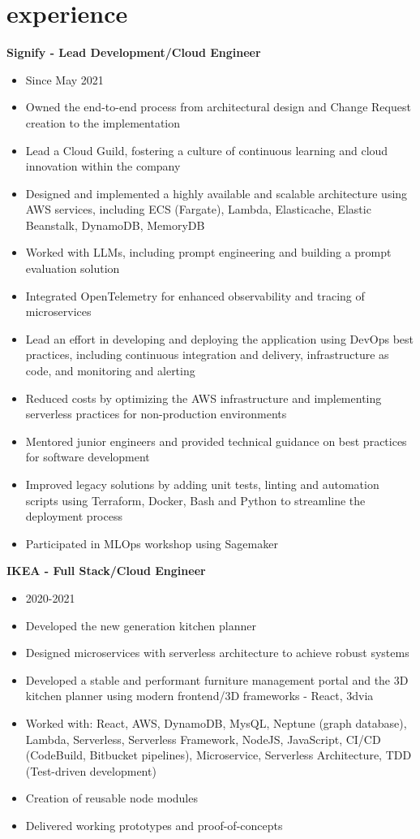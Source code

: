 \documentclass[]{friggeri-cv}
\begin{document}
\section{experience}

\textbf{Signify - Lead Development/Cloud Engineer}
\begin{itemize}
  \item Since May 2021
  \item Owned the end-to-end process from architectural design and Change Request creation to the implementation
  \item Lead a Cloud Guild, fostering a culture of continuous learning and cloud innovation within the company
  \item Designed and implemented a highly available and scalable architecture using AWS services, including ECS (Fargate), Lambda, Elasticache, Elastic Beanstalk, DynamoDB, MemoryDB
  \item Worked with LLMs, including prompt engineering and building a prompt evaluation solution
  \item Integrated OpenTelemetry for enhanced observability and tracing of microservices
  \item Lead an effort in developing and deploying the application using DevOps best practices, including continuous integration and delivery, infrastructure as code, and monitoring and alerting
  \item Reduced costs by optimizing the AWS infrastructure and implementing serverless practices for non-production environments
  \item Mentored junior engineers and provided technical guidance on best practices for software development
  \item Improved legacy solutions by adding unit tests, linting and automation scripts using Terraform, Docker, Bash and Python to streamline the deployment process
  \item Participated in MLOps workshop using Sagemaker
\end{itemize}

\textbf{IKEA - Full Stack/Cloud Engineer}
\begin{itemize}
  \item 2020-2021
  \item Developed the new generation kitchen planner
  \item Designed microservices with serverless architecture to achieve robust systems
  \item Developed a stable and performant furniture management portal and the 3D kitchen planner using modern frontend/3D frameworks - React, 3dvia
  \item Worked with: React, AWS, DynamoDB, MysQL, Neptune (graph database), Lambda, Serverless, Serverless Framework, NodeJS, JavaScript, CI/CD (CodeBuild, Bitbucket pipelines), Microservice, Serverless Architecture, TDD (Test-driven development)
  \item Creation of reusable node modules
  \item Delivered working prototypes and proof-of-concepts
\end{itemize}
\end{document}
